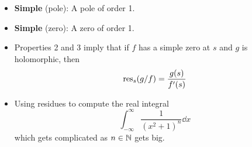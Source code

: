 \documentclass[../notes.tex]{subfiles}
\begin{document}
\begin{itemize}
\begin{enumerate}
\begin{proof}
\begin{equation*}
            \end{equation*}
            Therefore,
            \begin{equation*}
                \res_s(g\cdot f) = b_0a_{-1}
                = g(s)\res_sf
            \end{equation*}
            as desired.
        \end{proof}
    \end{enumerate}
    \item \textbf{Simple} (pole): A pole of order 1.
    \item \textbf{Simple} (zero): A zero of order 1.
    \item Properties 2 and 3 imply that if $f$ has a simple zero at $s$ and $g$ is holomorphic, then
    \begin{equation*}
        \operatorname{res}_s(g/f) = \frac{g(s)}{f'(s)}
    \end{equation*}
        
    \item Using residues to compute the real integral
    \begin{equation*}
        \int_{-\infty}^\infty\frac{1}{(x^2+1)^n}\dd{x}
    \end{equation*}
    which gets complicated as $n\in\mathbb{N}$ gets big.
    \begin{figure}[h!]
        \centering
\end{figure}
\end{itemize}
\end{document}
